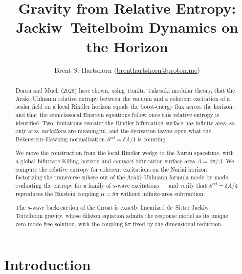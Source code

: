 \documentclass[11pt]{article}
\title{\textbf{Gravity from Relative Entropy:}\\ Jackiw--Teitelboim Dynamics on the \Nariai{} Horizon}
\author{Brent S. Hartshorn \orcidlink{0009-0004-2853-655X} (\url{brenthartshorn@proton.me})}
\newcommand{\Srel}{S^{\mathrm{rel}}}
\newcommand{\Nariai}{Nariai}
\begin{document}
\maketitle

\begin{abstract}
Dorau and Much (2026) \cite{DorauMuch} have shown, using Tomita--Takesaki modular theory, that the Araki--Uhlmann relative entropy between the vacuum and a coherent excitation of a scalar field on a local Rindler horizon equals the boost-energy flux across the horizon, and that the semiclassical Einstein equations follow once this relative entropy is identified. Two limitations remain: the Rindler bifurcation surface has infinite area, so only area \emph{variations} are meaningful, and the derivation leaves open what the Bekenstein--Hawking normalization $\Srel = \delta A/4$ is counting.

We move the construction from the local Rindler wedge to the \Nariai{} spacetime, with a global bifurcate Killing horizon and \emph{compact} bifurcation surface area $A = 4\pi/\Lambda$. We compute the relative entropy for coherent excitations on the \Nariai{} horizon --- factorizing the transverse sphere out of the Araki--Uhlmann formula mode by mode, evaluating the entropy for a family of $s$-wave excitations --- and verify that $\Srel = \delta A/4$ reproduces the Einstein coupling $\alpha = 8\pi$ without infinite-area subtraction.

The $s$-wave backreaction of the throat is exactly linearized de~Sitter Jackiw--Teitelboim gravity, whose dilaton equation admits the response model as its unique zero-mode-free solution, with the coupling $8\pi$ fixed by the dimensional reduction.
\end{abstract}

\section{Introduction}
\label{sec:intro}
\end{document}
